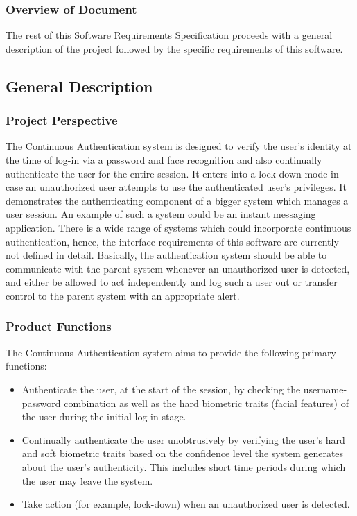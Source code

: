 \documentclass[12pt]{article}			%
\begin{document}
\subsubsection{ Overview of Document }
The rest of this Software Requirements Specification proceeds with a general description of the project followed by the specific requirements of this software. 

\subsection{ General Description }
\subsubsection{ Project Perspective }
The Continuous Authentication system is designed to verify the user's identity at the time of log-in via a password and face recognition and also continually authenticate the user for the entire session. It enters into a lock-down mode in case an unauthorized user attempts to use the authenticated user's privileges.
It demonstrates the authenticating component of a bigger system which manages a user session. An example of such a system could be an instant messaging application. There is a wide range of systems which could incorporate continuous authentication, hence, the interface requirements of this software are currently not defined in detail. Basically, the authentication system should be able to communicate with the parent system whenever an unauthorized user is detected, and either be allowed to act independently and log such a user out or transfer control to the parent system with an appropriate alert.

\subsubsection{ Product Functions }
The Continuous Authentication system aims to provide the following primary functions:
\begin{itemize}
	\item Authenticate the user, at the start of the session, by checking the username-password combination as well as the hard biometric traits (facial features) of the user during the initial log-in stage.
	\item Continually authenticate the user unobtrusively by verifying the user's hard and soft biometric traits based on the confidence level the system generates about the user's authenticity. This includes short time periods during which the user may leave the system.	
	\item Take action (for example, lock-down) when an unauthorized user is detected.
\end{itemize}
\end{document}
